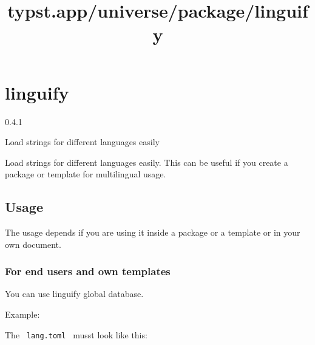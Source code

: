 \title{typst.app/universe/package/linguify}

\label{banner}
\section{linguify}\label{linguify}

{ 0.4.1 }

Load strings for different languages easily

\label{readme}
Load strings for different languages easily. This can be useful if you
create a package or template for multilingual usage.

\subsection{Usage}\label{usage}

The usage depends if you are using it inside a package or a template or
in your own document.

\subsubsection{For end users and own
templates}\label{for-end-users-and-own-templates}

You can use linguify global database.

Example:

\begin{Shaded}
\begin{Highlighting}[]



\end{Highlighting}
\end{Shaded}

The \texttt{\ lang.toml\ } musst look like this:

\begin{Shaded}
\begin{Highlighting}[]
\KeywordTok{[conf]}
 \OperatorTok{=} 

\KeywordTok{[en]}
 \OperatorTok{=} 
 \OperatorTok{=} 

\KeywordTok{[de]}
 \OperatorTok{=} 
 \OperatorTok{=} 
\end{Highlighting}
\end{Shaded}

